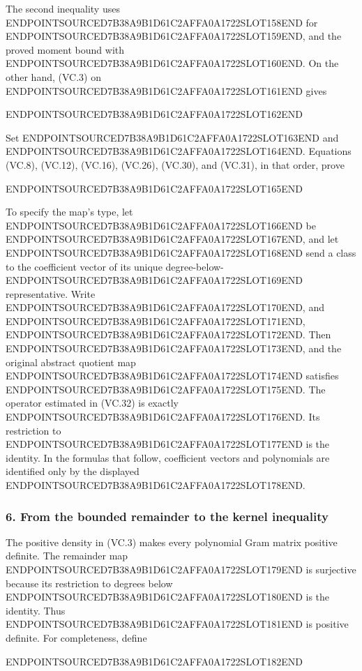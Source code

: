 The second inequality uses ENDPOINTSOURCED7B38A9B1D61C2AFFA0A1722SLOT158END for ENDPOINTSOURCED7B38A9B1D61C2AFFA0A1722SLOT159END, and the proved moment bound with ENDPOINTSOURCED7B38A9B1D61C2AFFA0A1722SLOT160END. On the other hand, (VC.3) on ENDPOINTSOURCED7B38A9B1D61C2AFFA0A1722SLOT161END gives

ENDPOINTSOURCED7B38A9B1D61C2AFFA0A1722SLOT162END

Set ENDPOINTSOURCED7B38A9B1D61C2AFFA0A1722SLOT163END and ENDPOINTSOURCED7B38A9B1D61C2AFFA0A1722SLOT164END. Equations (VC.8), (VC.12), (VC.16), (VC.26), (VC.30), and (VC.31), in that order, prove

ENDPOINTSOURCED7B38A9B1D61C2AFFA0A1722SLOT165END

To specify the map's type, let ENDPOINTSOURCED7B38A9B1D61C2AFFA0A1722SLOT166END be ENDPOINTSOURCED7B38A9B1D61C2AFFA0A1722SLOT167END, and let ENDPOINTSOURCED7B38A9B1D61C2AFFA0A1722SLOT168END send a class to the coefficient vector of its unique degree-below-ENDPOINTSOURCED7B38A9B1D61C2AFFA0A1722SLOT169END representative. Write ENDPOINTSOURCED7B38A9B1D61C2AFFA0A1722SLOT170END, and ENDPOINTSOURCED7B38A9B1D61C2AFFA0A1722SLOT171END, ENDPOINTSOURCED7B38A9B1D61C2AFFA0A1722SLOT172END. Then ENDPOINTSOURCED7B38A9B1D61C2AFFA0A1722SLOT173END, and the original abstract quotient map ENDPOINTSOURCED7B38A9B1D61C2AFFA0A1722SLOT174END satisfies ENDPOINTSOURCED7B38A9B1D61C2AFFA0A1722SLOT175END. The operator estimated in (VC.32) is exactly ENDPOINTSOURCED7B38A9B1D61C2AFFA0A1722SLOT176END. Its restriction to ENDPOINTSOURCED7B38A9B1D61C2AFFA0A1722SLOT177END is the identity. In the formulas that follow, coefficient vectors and polynomials are identified only by the displayed ENDPOINTSOURCED7B38A9B1D61C2AFFA0A1722SLOT178END.

\subsubsection{6. From the bounded remainder to the kernel inequality}\label{endpoint-volume_connection_original--from-the-bounded-remainder-to-the-kernel-inequality}

The positive density in (VC.3) makes every polynomial Gram matrix positive definite. The remainder map ENDPOINTSOURCED7B38A9B1D61C2AFFA0A1722SLOT179END is surjective because its restriction to degrees below ENDPOINTSOURCED7B38A9B1D61C2AFFA0A1722SLOT180END is the identity. Thus ENDPOINTSOURCED7B38A9B1D61C2AFFA0A1722SLOT181END is positive definite. For completeness, define

ENDPOINTSOURCED7B38A9B1D61C2AFFA0A1722SLOT182END

